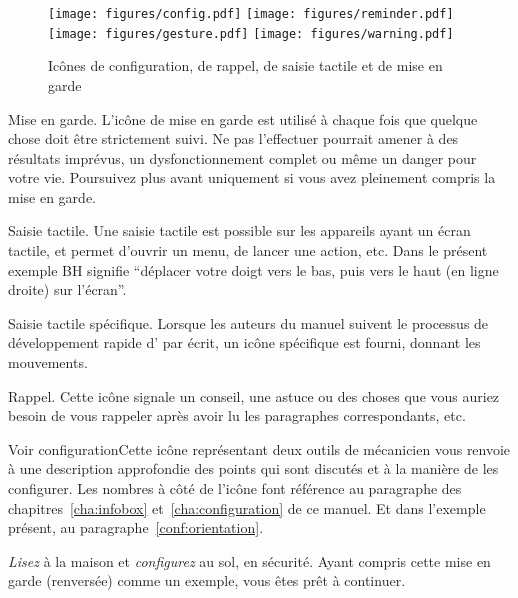 \begin{figure}[h]
\centering
\texttt{[image: figures/config.pdf]}
\hspace{1.5cm}
\texttt{[image: figures/reminder.pdf]}
\hspace{1.5cm}
\texttt{[image: figures/gesture.pdf]}
\hspace{1.5cm}
\texttt{[image: figures/warning.pdf]}
\caption{Icônes de configuration, de rappel, de saisie tactile et de mise en garde}
\end{figure}

\warning Mise en garde. L'icône de mise en garde est utilisé à chaque fois que quelque chose
doit être strictement suivi. Ne pas l'effectuer pourrait amener à des résultats imprévus, un dysfonctionnement complet ou même un danger pour votre vie. Poursuivez plus avant uniquement si vous avez pleinement compris la mise en garde.

 Saisie tactile. Une saisie tactile est possible sur les appareils ayant
un écran tactile, et permet d'ouvrir un menu, de lancer une action, etc. Dans le présent exemple BH
signifie ``déplacer votre doigt vers le bas, puis vers le haut (en ligne droite) sur l'écran''.
 
 Saisie tactile spécifique. Lorsque les auteurs du manuel suivent le processus de développement rapide d'\xc{} par écrit, un icône spécifique est fourni, donnant les mouvements.

\tip Rappel. Cette icône signale un conseil, une astuce ou des choses que vous auriez besoin de vous 
rappeler après avoir lu les paragraphes correspondants, etc.

 Voir configuration\textellipsis Cette icône représentant deux outils
de mécanicien vous renvoie à une description approfondie des points qui sont discutés et à la
manière de les configurer. Les nombres à côté de l'icône font référence au paragraphe
des chapitres~\ref{cha:infobox} et~\ref{cha:configuration} de ce manuel. Et dans l'exemple présent,
au paragraphe~\ref{conf:orientation}. 


\emph{Lisez} à la maison et \emph{configurez} au sol, en sécurité. Ayant compris cette mise en garde
(renversée) comme un exemple, vous êtes prêt à continuer.

